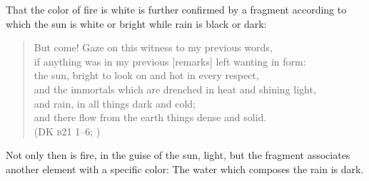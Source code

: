 That the color of fire is white is further confirmed by a fragment according to which the sun is white or bright while rain is black or dark:
\begin{verse}
    But come! Gaze on this witness to my previous words,\\
    if anything was in my previous [remarks] left wanting in form:\\
    the sun, bright to look on and hot in every respect,\\
    and the immortals which are drenched in heat and shining light,\\
    and rain, in all things dark and cold;\\
    and there flow from the earth things dense and solid.\\
    (DK \textsc{b}21 1--6; \citealt[26 1--6, 229]{Inwood:2001ve})
\end{verse}
Not only then is fire, in the guise of the sun, light, but the fragment associates another element with a specific color: The water which composes the rain is dark.

